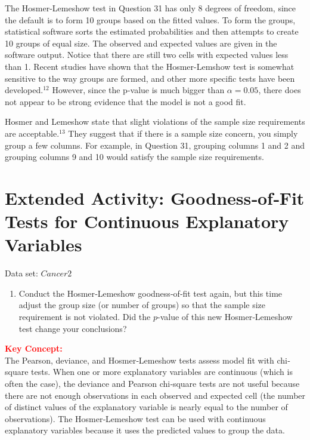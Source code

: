 \documentclass[
]{report}
\providecommand{\tightlist}{%
  \setlength{\itemsep}{0pt}\setlength{\parskip}{0pt}}
\begin{document}
The Hosmer-Lemeshow test in Question 31 has only 8 degrees of freedom, since the default is to form 10
groups based on the fitted values. To form the groups, statistical software sorts the estimated probabilities and
then attempts to create 10 groups of equal size. The observed and expected values are given in the software
output. Notice that there are still two cells with expected values less than 1. Recent studies have shown that
the Hosmer-Lemshow test is somewhat sensitive to the way groups are formed, and other more specific tests
have been developed.\(^12\) However, since the p-value is much bigger than \(\alpha = 0.05\), there does not appear to
be strong evidence that the model is not a good fit.

Hosmer and Lemeshow state that slight violations of the sample size requirements are acceptable.\(^13\) They
suggest that if there is a sample size concern, you simply group a few columns. For example, in Question
31, grouping columns 1 and 2 and grouping columns 9 and 10 would satisfy the sample size requirements.

\section*{Extended Activity: Goodness‐of‐Fit Tests for Continuous Explanatory Variables}\label{extended-activity-goodnessoffit-tests-for-continuous-explanatory-variables-1}

Data set: \(Cancer2\)

\begin{enumerate}
\def\labelenumi{\arabic{enumi}.}
\setcounter{enumi}{31}
\tightlist
\item
  Conduct the Hosmer‐Lemeshow goodness‐of‐fit test again, but this time adjust the group size (or number of groups) so that the sample size requirement is not violated. Did the \(p\)-value of this new Hosmer‐Lemeshow test change your conclusions?
\end{enumerate}

\large

\textbf{\textcolor{red}{Key Concept:}}\\
\color{red}
The Pearson, deviance, and Hosmer‐Lemeshow tests assess model fit with chi‐square tests. When one or more explanatory variables are continuous (which is often the case), the deviance and Pearson chi‐square tests are not useful because there are not enough observations in each observed and expected cell (the number of distinct values of the explanatory variable is nearly equal to the number of observations). The Hosmer‐Lemeshow test can be used with continuous explanatory variables because it uses the predicted values to group the data.
\color{black}
\normalsize
\end{document}
